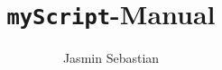 \documentclass{myReport}
\title{\texttt{myScript}-Manual}
\author{Jasmin Sebastian}
\begin{document}
	

\blinddocument
	
	
\end{document}
